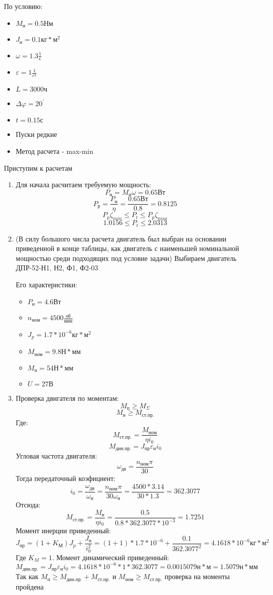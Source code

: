 \documentclass{article}
\begin{document}
\begin{enumerate}
	По условию:
	\begin{itemize}
		\item $M_{н} = 0.5 Нм$
		\item $J_н = 0.1 кг * м^2$
		\item $ \omega = 1.3 \frac{1}{с}$
		\item $ \varepsilon = 1 \frac{1}{c^2} $
		\item $L = 3000 ч$
		\item $ \Delta \varphi = 20^{'}$
		\item $t = 0.15 с$
		\item Пуски редкие
		\item Метод расчета - max-min
	\end{itemize}
	Приступим к расчетам
	\begin{enumerate}
		\item Для начала расчитаем требуемую мощность:
		$$
		P_н = M_н \omega = 0.65 Вт
		$$
		$$
		P_р = \frac{P_н}{ \eta} = \frac{0.65 Вт}{0.8} = 0.8125
		$$
		$$
		P_p \zeta_{min} \le P_t \le P_p \zeta_{max}
		$$	
		$$
		1.0156 \le P_t \le 2.0313
		$$
		\item (В силу большого числа расчета двигатель был выбран на основании приведенной в конце таблицы, как двигатель с наименьшей номинальной мощностью среди подходящих под условие задачи) Выбираем двигатель ДПР-52-Н1, Н2, Ф1, Ф2-03

		Его характеристики:
		\begin{itemize}
			\item $P_н = 4.6 Вт$
			\item $n_{ном} = 4500 \frac{об}{мин} $
			\item $J_p = 1.7 * 10^{-6} кг * м^2$
			\item $M_{ном} = 9.8 Н * мм$
			\item $M_п = 54 Н * мм$
			\item $U = 27 В$
		\end{itemize}
		\item Проверка двигателя по моментам:
		$$
		M_п \ge M_{ \Sigma}
		$$
		$$
		M_н \ge M_{ст. пр.}
		$$
		Где:
		$$
		M_{ст. пр.} = \frac{M_{ном}}{ \eta i_0} 
		$$
		$$
		M_{дин. пр.} = J_{пр} \varepsilon_н i_0
		$$
		Угловая частота двигателя:
		$$
		\omega_{дв} = \frac{n_{ном} \pi}{30} 
		$$
		Тогда передаточный коэфициент:
		$$
		i_0 = \frac{ \omega_{дв}}{ \omega_{н}} = \frac{n_{ном} \pi}{30 \omega_{н}} = \frac{4500 * 3.14}{30 * 1.3} = 362.3077
		$$
		Отсюда:
		$$
		M_{ст. пр.} = \frac{M_н}{ \eta i_0} = \frac{0.5}{0.8 * 362.3077 * 10^{-3}} = 1.7251
		$$
		Момент инерции приведенный:
		$$
		J_{пр} = \left(1 + K_М\right) J_p + \frac{J_н}{i_0^2} = \left(1 + 1\right) * 1.7 * 10^{-6} + \frac{0.1}{362.3077^2} = 4.1618 * 10^{-6} кг * м^2
		$$
		Где $K_M = 1$. Момент динамический приведенный:
		$$
		M_{дин. пр.} = J_{пр} \varepsilon_н i_0 = 4.1618 * 10^{-6} * 1 * 362.3077 = 0.0015079 н * м = 1.5079 н * мм
		$$
		Так как $M_п \ge M_{дин. пр.} + M_{ст. пр.}$ и $M_{ном} \ge M_{ст. пр.}$ проверка на моменты пройдена
		

\end{enumerate}
\end{enumerate}
\end{document}
